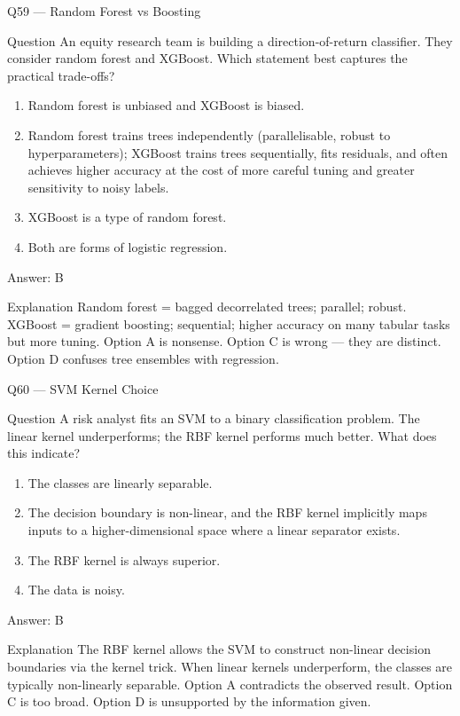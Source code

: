 \documentclass[aspectratio=169,8pt]{beamer}
\begin{document}
	\begin{frame}{Q59 --- Random Forest vs Boosting}
		\begin{block}{Question}
			An equity research team is building a direction-of-return classifier. They consider random forest and XGBoost. Which statement best captures the practical trade-offs?
		\end{block}
		\begin{enumerate}
			\item Random forest is unbiased and XGBoost is biased.
			\item Random forest trains trees independently (parallelisable, robust to hyperparameters); XGBoost trains trees sequentially, fits residuals, and often achieves higher accuracy at the cost of more careful tuning and greater sensitivity to noisy labels.
			\item XGBoost is a type of random forest.
			\item Both are forms of logistic regression.
		\end{enumerate}
		\begin{exampleblock}{Answer: B}\end{exampleblock}
		\begin{block}{Explanation}
			Random forest = bagged decorrelated trees; parallel; robust. XGBoost = gradient boosting; sequential; higher accuracy on many tabular tasks but more tuning. Option A is nonsense. Option C is wrong --- they are distinct. Option D confuses tree ensembles with regression.
		\end{block}
	\end{frame}
	
	\begin{frame}{Q60 --- SVM Kernel Choice}
		\begin{block}{Question}
			A risk analyst fits an SVM to a binary classification problem. The linear kernel underperforms; the RBF kernel performs much better. What does this indicate?
		\end{block}
		\begin{enumerate}
			\item The classes are linearly separable.
			\item The decision boundary is non-linear, and the RBF kernel implicitly maps inputs to a higher-dimensional space where a linear separator exists.
			\item The RBF kernel is always superior.
			\item The data is noisy.
		\end{enumerate}
		\begin{exampleblock}{Answer: B}\end{exampleblock}
		\begin{block}{Explanation}
			The RBF kernel allows the SVM to construct non-linear decision boundaries via the kernel trick. When linear kernels underperform, the classes are typically non-linearly separable. Option A contradicts the observed result. Option C is too broad. Option D is unsupported by the information given.
		\end{block}
	\end{frame}
	
\end{document}
